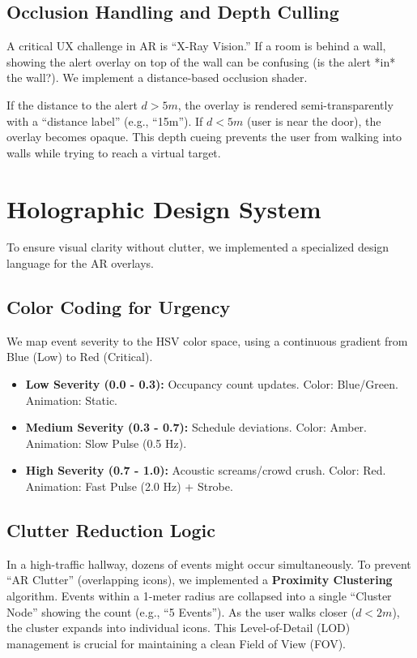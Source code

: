 \documentclass[conference]{IEEEtran}
\begin{document}
\subsection{Occlusion Handling and Depth Culling}
A critical UX challenge in AR is ``X-Ray Vision.'' If a room is behind a wall, showing the alert overlay on top of the wall can be confusing (is the alert *in* the wall?). We implement a distance-based occlusion shader. 

If the distance to the alert $d > 5m$, the overlay is rendered semi-transparently with a ``distance label'' (e.g., ``15m''). If $d < 5m$ (user is near the door), the overlay becomes opaque. This depth cueing prevents the user from walking into walls while trying to reach a virtual target.

\section{Holographic Design System}

To ensure visual clarity without clutter, we implemented a specialized design language for the AR overlays.

\subsection{Color Coding for Urgency}
We map event severity to the HSV color space, using a continuous gradient from Blue (Low) to Red (Critical).
\begin{itemize}
    \item \textbf{Low Severity (0.0 - 0.3):} Occupancy count updates. Color: Blue/Green. Animation: Static.
    \item \textbf{Medium Severity (0.3 - 0.7):} Schedule deviations. Color: Amber. Animation: Slow Pulse (0.5 Hz).
    \item \textbf{High Severity (0.7 - 1.0):} Acoustic screams/crowd crush. Color: Red. Animation: Fast Pulse (2.0 Hz) + Strobe.
\end{itemize}

\subsection{Clutter Reduction Logic}
In a high-traffic hallway, dozens of events might occur simultaneously. To prevent ``AR Clutter'' (overlapping icons), we implemented a \textbf{Proximity Clustering} algorithm. Events within a 1-meter radius are collapsed into a single ``Cluster Node'' showing the count (e.g., ``5 Events''). As the user walks closer ($d < 2m$), the cluster expands into individual icons. This Level-of-Detail (LOD) management is crucial for maintaining a clean Field of View (FOV).
\end{document}
